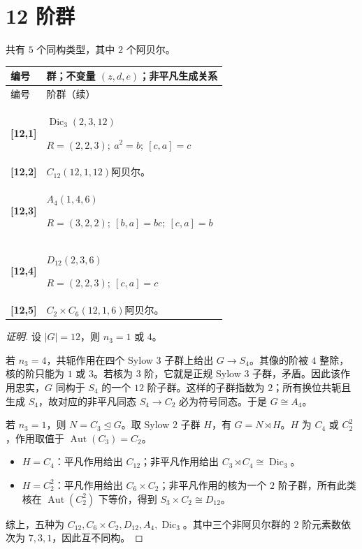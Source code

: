 \documentclass[UTF8,fontset=fandol,11pt,a4paper]{ctexart}
\newcommand{\Aut}{\operatorname{Aut}}\newcommand{\GL}{\operatorname{GL}}\newcommand{\ord}{\operatorname{ord}}\newcommand{\Z}{\mathrm Z}
\begin{document}
\section*{12 阶群}\label{order:12}

共有 $5$ 个同构类型，其中 $2$ 个阿贝尔。

\begingroup\small\setlength{\tabcolsep}{3pt}\renewcommand{\arraystretch}{1.12}

\begin{longtable}{@{}p{17mm}>{\raggedright\arraybackslash}p{141mm}@{}}

\toprule 编号 & 群；不变量 $(z,d,e)$；非平凡生成关系\\\midrule\endfirsthead

\toprule 编号 & 12 阶群（续）\\\midrule\endhead\bottomrule\endfoot

\textbf{[12,1]} & $\operatorname{Dic}_3$\quad $(2,3,12)$\par\(R=(2,2,3);\allowbreak\ a^{2}=b;\allowbreak\ [c,a]=c\)\\[3pt]

\textbf{[12,2]} & $C_{12}$\quad $(12,1,12)$\quad 阿贝尔。\\[3pt]

\textbf{[12,3]} & $A_{4}$\quad $(1,4,6)$\par\(R=(3,2,2);\allowbreak\ [b,a]=bc;\allowbreak\ [c,a]=b\)\\[3pt]

\textbf{[12,4]} & $D_{12}$\quad $(2,3,6)$\par\(R=(2,2,3);\allowbreak\ [c,a]=c\)\\[3pt]

\textbf{[12,5]} & $C_{2}\times C_{6}$\quad $(12,1,6)$\quad 阿贝尔。\\[3pt]

\end{longtable}\endgroup

\begin{proof}[证明]
设 $|G|=12$，则 $n_3=1$ 或 $4$。

若 $n_3=4$，共轭作用在四个 Sylow $3$ 子群上给出 $G\to S_4$。其像的阶被 $4$ 整除，核的阶只能为 $1$ 或 $3$。若核为 $3$ 阶，它就是正规 Sylow $3$ 子群，矛盾。因此该作用忠实，$G$ 同构于 $S_4$ 的一个 $12$ 阶子群。这样的子群指数为 $2$；所有换位共轭且生成 $S_4$，故对应的非平凡同态 $S_4\to C_2$ 必为符号同态。于是 $G\cong A_4$。

若 $n_3=1$，则 $N=C_3\trianglelefteq G$。取 Sylow $2$ 子群 $H$，有 $G=N\rtimes H$。$H$ 为 $C_4$ 或 $C_2^2$，作用取值于 $\Aut(C_3)=C_2$。
\begin{itemize}
\item $H=C_4$：平凡作用给出 $C_{12}$；非平凡作用给出 $C_3\rtimes C_4\cong\operatorname{Dic}_3$。
\item $H=C_2^2$：平凡作用给出 $C_6\times C_2$；非平凡作用的核为一个 $2$ 阶子群，所有此类核在 $\Aut(C_2^2)$ 下等价，得到 $S_3\times C_2\cong D_{12}$。
\end{itemize}
综上，五种为 $C_{12},C_6\times C_2,D_{12},A_4,\operatorname{Dic}_3$。其中三个非阿贝尔群的 $2$ 阶元素数依次为 $7,3,1$，因此互不同构。
\end{proof}
\end{document}
